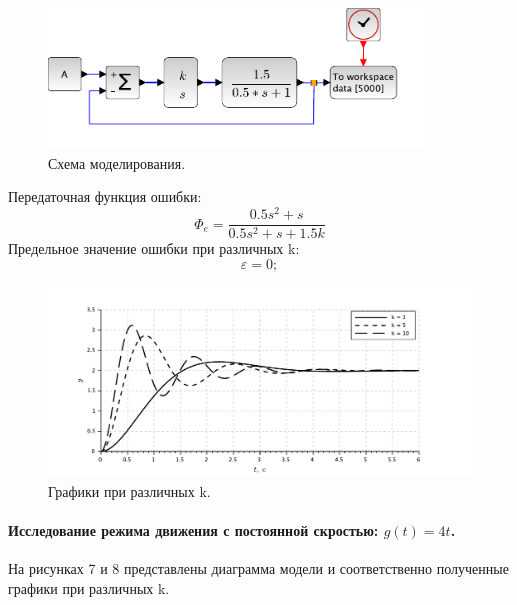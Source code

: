 \documentclass[a4paper, 11pt]{article}
\begin{document}
\begin{minipage}[t]{0.5\textwidth}
    \begin{figure}[H]
        \centering
        \includegraphics[width = 0.9\textwidth]{images/model2-1.pdf}
        \caption{Схема моделирования.}
    \end{figure}
\end{minipage}
\begin{minipage}[t]{0.5\textwidth}
    \vspace{0.5cm}
    Передаточная функция ошибки:
    \begin{equation}
        \Phi_e = \frac{0.5s^2 + s}{0.5s^2 + s + 1.5k}
    \end{equation}
    Предельное значение ошибки при различных k:
    \begin{equation*}
        \varepsilon = 0;
    \end{equation*}
\end{minipage}

\begin{figure}[h!]
    \centering
    \includegraphics[width = \textwidth]{images/graph2-1.pdf}
    \caption{Графики при различных k.}
\end{figure}

\newpage
\paragraph{Исследование режима движения с постоянной скростью: $g(t) = 4t$.} На рисунках 7 и 8 представлены диаграмма модели и соответственно полученные графики при различных k.
\end{document}
